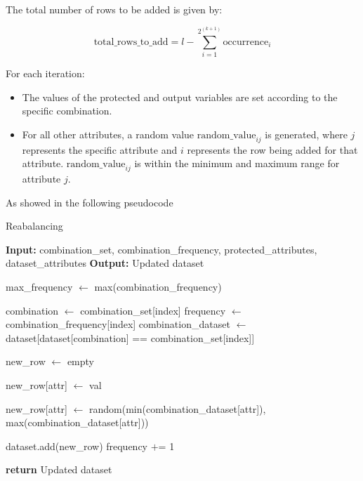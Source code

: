 \documentclass[12pt,a4paper,openright,twoside]{book}
\begin{document}
The total number of rows to be added is given by:

\[
\text{total\_rows\_to\_add} = l - \sum_{i=1}^{2^{(k+1)}} \text{occurrence}_i
\]

For each iteration:

\begin{itemize}

    \item The values of the protected and output variables are set according to the specific combination.
    
    \item For all other attributes, a random value \( \text{random\_value}_{ij} \) is generated, where \( j \) represents the specific attribute and \( i \) represents the row being added for that attribute. \( \text{random\_value}_{ij} \) is within the minimum and maximum range for attribute \( j \).

\end{itemize}

As showed in the following pseudocode

\begin{algorithm}[H]
    \caption{Reabalancing}
    \begin{algorithmic}[1]
        \State \textbf{Input:} combination\_set, combination\_frequency, protected\_attributes, dataset\_attributes
        \State \textbf{Output:} Updated dataset

        \State max\_frequency $\gets$ max(combination\_frequency)

            \State combination $\gets$ combination\_set[index]
            \State frequency $\gets$ combination\_frequency[index]
            \State combination\_dataset $\gets$ dataset[dataset[combination] == combination\_set[index]]

                \State new\_row $\gets$ empty

                    \State new\_row[attr] $\gets$ val
                \EndFor

                    \State new\_row[attr] $\gets$ random(min(combination\_dataset[attr]), max(combination\_dataset[attr]))
                \EndFor

                \State dataset.add(new\_row)
                \State frequency $+$= 1
            \EndWhile
        \EndFor

        \State \textbf{return} Updated dataset
    \end{algorithmic}
\end{algorithm}
\end{document}

